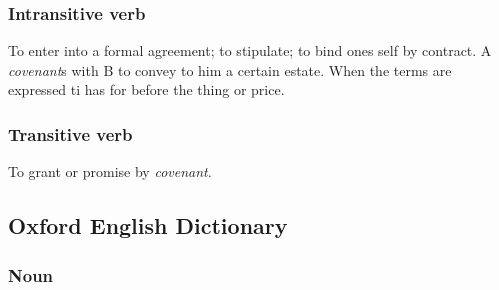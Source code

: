 	\subsubsection{Intransitive verb}
	
		\begin{compactitem}
			\item To enter into a formal agreement; to stipulate; to bind ones self by contract. A \textit{covenant}s with B to convey to him a certain estate. When the terms are expressed ti has for before the thing or price.
		\end{compactitem}
		
	\subsubsection{Transitive verb}
	
		\begin{compactitem}
			\item To grant or promise by \textit{covenant}.
		\end{compactitem}

\subsection{Oxford English Dictionary} %
	\label{COVENANT-OED}
	
	\subsubsection{Noun}

